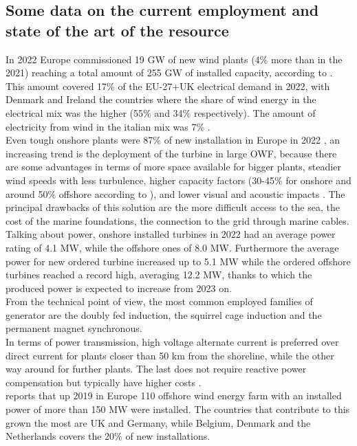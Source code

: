 \subsection{Some data on the current employment and state of the art of the resource}
In 2022 Europe commissioned 19 GW of new wind plants (4\% more than in the 2021) reaching a total amount of 255 GW of installed capacity, according to \cite{wind_europe_data_2022}. This amount covered 17\% of the EU-27+UK electrical demand in 2022, with Denmark and Ireland the countries where the share of wind energy in the electrical mix was the higher (55\% and 34\% respectively). The amount of electricity from wind in the italian mix was 7\% \cite{wind_europe_data_2022}.\\
Even tough onshore plants were 87\% of new installation in Europe in 2022 \cite{wind_europe_data_2022}, an increasing trend is the deployment of the turbine in large \acrfull{OWF}, because there are some advantages in terms of more space available for bigger plants, steadier wind speeds with less turbulence, higher capacity factors (30-45\% for onshore and around 50\% offshore according to \cite{wind_europe_data_2022}), and lower visual and acoustic impacts \cite{current_staus_and_future_trends_of_offshore_wind_power_in_europe}. The principal drawbacks of this solution are the more difficult access to the sea, the cost of the marine foundations, the connection to the grid through marine cables.  \\
Talking about power, onshore installed turbines in 2022 had an average power rating of 4.1 MW, while the offshore ones of 8.0 MW. Furthermore the average power for new ordered turbine increased up to 5.1 MW while the ordered offshore turbines reached a record high, averaging 12.2 MW, thanks to which the produced power is expected to increase from 2023 on.\\

From the technical point of view, the most common employed families of generator are the doubly fed induction, the squirrel cage induction and the permanent magnet synchronous.\\
In terms of power transmission, high voltage alternate current is preferred over direct current for plants closer than 50 km from the shoreline, while the other way around for further plants. The last does not require reactive power compensation but typically have higher costs \cite{current_staus_and_future_trends_of_offshore_wind_power_in_europe}.\\
\cite{current_staus_and_future_trends_of_offshore_wind_power_in_europe} reports that up 2019 in Europe 110 offshore wind energy farm with an installed power of more than 150 MW were installed. The countries that contribute to this grown the most are UK and Germany, while Belgium, Denmark and the Netherlands covers the 20\% of new installations.

